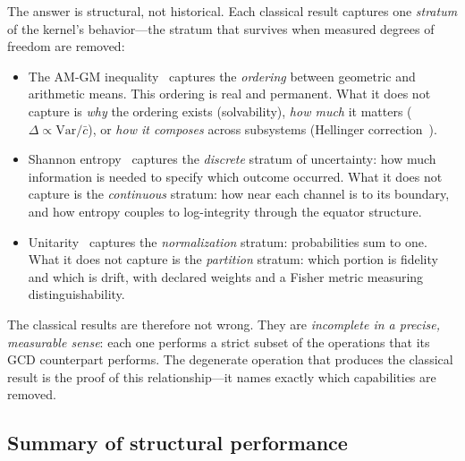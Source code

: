\documentclass[
  aps,
  prd,
  twocolumn,
  superscriptaddress,
  nofootinbib,
  floatfix
]{revtex4-2}
\begin{document}
The answer is structural, not historical.
Each classical result captures one \emph{stratum} of the
kernel's behavior---the stratum that survives when
measured degrees of freedom are removed:

\begin{itemize}[leftmargin=*]
\item The AM-GM inequality~\cite{hardylittlewoodpolya1952}
  captures the \emph{ordering} between geometric and arithmetic
  means.  This ordering is real and permanent.  What it does not
  capture is \emph{why} the ordering exists (solvability),
  \emph{how much} it matters
  ($\Delta \propto \mathrm{Var}/\bar{c}$), or \emph{how it
  composes} across subsystems
  (Hellinger correction~\cite{hellinger1909}).

\item Shannon entropy~\cite{shannon1948} captures the
  \emph{discrete} stratum of uncertainty: how much information
  is needed to specify which outcome occurred.  What it does not
  capture is the \emph{continuous} stratum: how near each channel is to
  its boundary, and how entropy couples to log-integrity
  through the equator structure.

\item Unitarity~\cite{weinberg1995qft1} captures the
  \emph{normalization} stratum: probabilities sum to one.
  What it does not capture is the \emph{partition} stratum: which portion is fidelity
  and which is drift, with declared weights and a Fisher
  metric measuring distinguishability.
\end{itemize}

The classical results are therefore not wrong.  They are
\emph{incomplete in a precise, measurable sense}: each one
performs a strict subset of the operations that its GCD
counterpart performs.  The degenerate operation that
produces the classical result is the proof of this
relationship---it names exactly which capabilities are
removed.

\subsection{Summary of structural performance}
\end{document}
